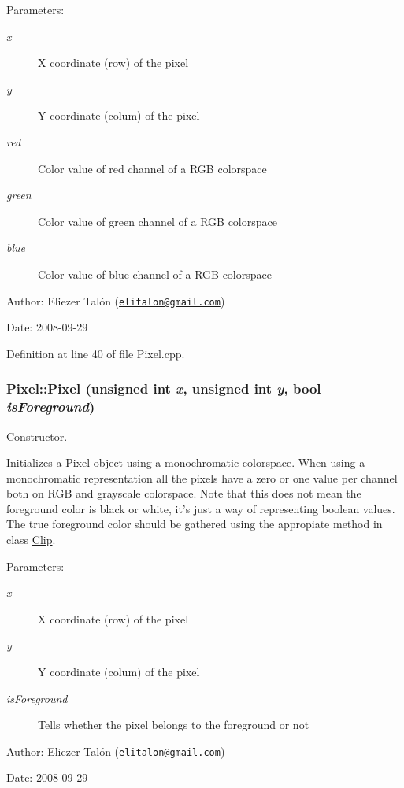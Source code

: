 \begin{Desc}
\item[Parameters:]
\begin{description}
\item[{\em x}]X coordinate (row) of the pixel \item[{\em y}]Y coordinate (colum) of the pixel \item[{\em red}]Color value of red channel of a RGB colorspace \item[{\em green}]Color value of green channel of a RGB colorspace \item[{\em blue}]Color value of blue channel of a RGB colorspace\end{description}
\end{Desc}
\begin{Desc}
\item[Author:]Eliezer Talón (\href{mailto:elitalon@gmail.com}{\tt elitalon@gmail.com}) \end{Desc}
\begin{Desc}
\item[Date:]2008-09-29 \end{Desc}


Definition at line 40 of file Pixel.cpp.\hypertarget{class_pixel_fcbda001fcad04f4166129f9195a65fa}{
\subsubsection[Pixel]{\setlength{\rightskip}{0pt plus 5cm}Pixel::Pixel (unsigned int {\em x}, \/  unsigned int {\em y}, \/  bool {\em isForeground})}}
\label{class_pixel_fcbda001fcad04f4166129f9195a65fa}


Constructor. 

Initializes a \hyperlink{class_pixel}{Pixel} object using a monochromatic colorspace. When using a monochromatic representation all the pixels have a zero or one value per channel both on RGB and grayscale colorspace. Note that this does not mean the foreground color is black or white, it's just a way of representing boolean values. The true foreground color should be gathered using the appropiate method in class \hyperlink{class_clip}{Clip}.

\begin{Desc}
\item[Parameters:]
\begin{description}
\item[{\em x}]X coordinate (row) of the pixel \item[{\em y}]Y coordinate (colum) of the pixel \item[{\em isForeground}]Tells whether the pixel belongs to the foreground or not\end{description}
\end{Desc}
\begin{Desc}
\item[Author:]Eliezer Talón (\href{mailto:elitalon@gmail.com}{\tt elitalon@gmail.com}) \end{Desc}
\begin{Desc}
\item[Date:]2008-09-29 \end{Desc}


